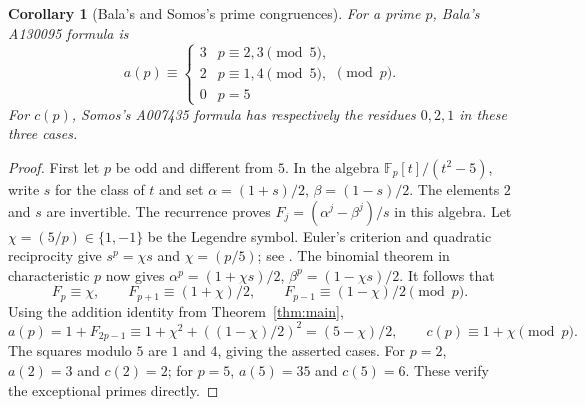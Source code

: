 \documentclass[11pt]{article}
\newtheorem{corollary}[theorem]{Corollary}
\begin{document}
\begin{corollary}[Bala's and Somos's prime congruences]\label{cor:prime}
For a prime $p$, Bala's A130095 formula is
\[
a(p)\equiv
\begin{cases}
3& p\equiv2,3\pmod5,\\
2& p\equiv1,4\pmod5,\\
0& p=5
\end{cases}\pmod p.
\]
For $c(p)$, Somos's A007435 formula has respectively the residues
$0,2,1$ in these three cases.
\end{corollary}
\begin{proof}
First let $p$ be odd and different from $5$. In the algebra
$\mathbb F_p[t]/(t^2-5)$, write $s$ for the class of $t$ and set
$\alpha=(1+s)/2$, $\beta=(1-s)/2$. The elements $2$ and $s$
are invertible. The recurrence proves
$F_j=(\alpha^j-\beta^j)/s$ in this algebra.
Let $\chi=(5/p)\in\{1,-1\}$ be the Legendre symbol.
Euler's criterion and quadratic reciprocity give
$s^p=\chi s$ and $\chi=(p/5)$; see \cite[Theorem~4.1.7,
Corollary~4.2.3]{stein}.
The binomial theorem in characteristic $p$ now gives
$\alpha^p=(1+\chi s)/2$, $\beta^p=(1-\chi s)/2$.
It follows that
\[
 F_p\equiv\chi,\qquad
 F_{p+1}\equiv(1+\chi)/2,\qquad
 F_{p-1}\equiv(1-\chi)/2\pmod p.
\]
Using the addition identity from Theorem~\ref{thm:main},
\[
 a(p)=1+F_{2p-1}
 \equiv1+\chi^2+((1-\chi)/2)^2=(5-\chi)/2,
 \qquad c(p)\equiv1+\chi\pmod p.
\]
The squares modulo $5$ are $1$ and $4$, giving the asserted cases.
For $p=2$, $a(2)=3$ and $c(2)=2$; for $p=5$,
$a(5)=35$ and $c(5)=6$. These verify the exceptional primes directly.
\end{proof}
\end{document}
